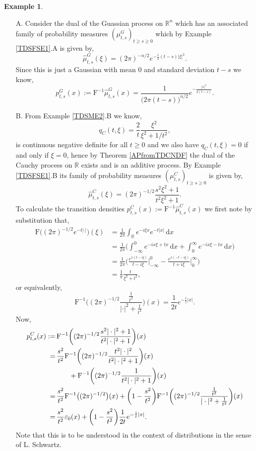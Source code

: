 \documentclass[a4paper, 12pt]{report}
\theoremstyle{cor}
\theoremstyle{remark}
\theoremstyle{definition}
\newtheorem{eg}[theorem]{Example}
\begin{document}
\begin{eg}
\hspace{0.5cm}
\begin{itemize}
\item[A.] Consider the dual of the Guassian process on $\mathbb{R}^n$ which has an associated family of probability measures $(\mu_{t, s}^G)_{t \ge s \ge 0}$ which by Example \ref{TDSFSE1}.A is given by,
$$
\hat{\mu}_{t, s}^G(\xi) = (2\pi)^{-n/2}e^{-\frac{1}{2}(t - s)|\xi|^2}.
$$
Since this is just a Gaussian with mean $0$ and standard deviation $t - s$ we know,
$$
p_{t, s}^G(x) := \mathrm{F}^{-1}\hat{\mu}_{t, s}^G(x) = \frac{1}{\big(2\pi(t - s)\big)^{n/2}}e^{-\frac{|x|^2}{2(t - s)}}.
$$

\item[B.] From Example \ref{TDSME2}.B we know,
$$
q_C(t, \xi) = \frac{2}{t}\frac{\xi^2}{\xi^2 + 1/t^2},
$$
is continuous negative definite for all $t \ge 0$ and we also have $q_C(t, \xi) = 0$ if and only if $\xi = 0$, hence by Theorem \ref{APfromTDCNDF} the dual of the Cauchy process on $\mathbb{R}$ exists and is an additive process.  By Example \ref{TDSFSE1}.B its family of probability measures $(\mu_{t, s}^C)_{t \ge s \ge 0}$ is given by,
$$
\hat{\mu}_{t, s}^C(\xi) = (2\pi)^{-1/2}\frac{s^2\xi^2 + 1}{t^2\xi^2 + 1}.
$$
To calculate the transition densities $p_{t, s}^C(x) := \mathrm{F}^{-1}\hat{\mu}_{t, s}^C(x)$ we first note by substitution that,
$$
\begin{aligned}
\mathrm{F}\big((2\pi)^{-1/2}e^{-t|\cdot|}\big)(\xi) & = \frac{1}{2\pi}\int_{\mathbb{R}}e^{-i\xi x}e^{-t|x|}\,\mathrm{d}x\\
& = \frac{1}{2\pi}\bigg(\int_{-\infty}^0 e^{-ix\xi + tx}\,\mathrm{d}x + \int_0^\infty e^{-ix\xi - tx}\,\mathrm{d}x\bigg)\\
& = \frac{1}{2\pi}\bigg(\frac{e^{x(t - i\xi)}}{t - i\xi}\bigg|_{-\infty}^0 - \frac{e^{x(-t - i\xi)}}{t + i\xi}\bigg|_0^\infty\bigg)\\
& = \frac{1}{\pi}\frac{t}{\xi^2 + t^2},
\end{aligned}
$$
or equivalently,
$$
\mathrm{F}^{-1}\bigg((2\pi)^{-1/2}\frac{\frac{1}{t^2}}{|\cdot|^2 + \frac{1}{t^2}}\bigg)(x) = \frac{1}{2t}e^{-\frac{1}{t}|x|}.
$$
Now,
$$
\begin{aligned}
p_{t, s}^C(x) := & \, \mathrm{F}^{-1}\bigg((2\pi)^{-1/2}\frac{s^2|\cdot|^2 + 1}{t^2|\cdot|^2 + 1}\bigg)(x)\\
= & \, \frac{s^2}{t^2}\mathrm{F}^{-1}\bigg((2\pi)^{-1/2}\frac{t^2|\cdot|^2}{t^2|\cdot|^2 + 1}\bigg)(x)\\
& \hspace{0.7cm} + \mathrm{F}^{-1}\bigg((2\pi)^{-1/2}\frac{1}{t^2|\cdot|^2 + 1}\bigg)(x)\\
= & \, \frac{s^2}{t^2}\mathrm{F}^{-1}\big((2\pi)^{-1/2}\big)(x) + \bigg(1 - \frac{s^2}{t^2}\bigg)\mathrm{F}^{-1}\bigg((2\pi)^{-1/2}\frac{\frac{1}{t^2}}{|\cdot|^2 + \frac{1}{t^2}}\bigg)(x)\\
= & \, \frac{s^2}{t^2}\varepsilon_0(x) + \bigg(1 - \frac{s^2}{t^2}\bigg)\frac{1}{2t}e^{-\frac{1}{t}|x|}.
\end{aligned}
$$
Note that this is to be understood in the context of distributions in the sense of L. Schwartz.


\end{itemize}
\end{eg}
\end{document}
